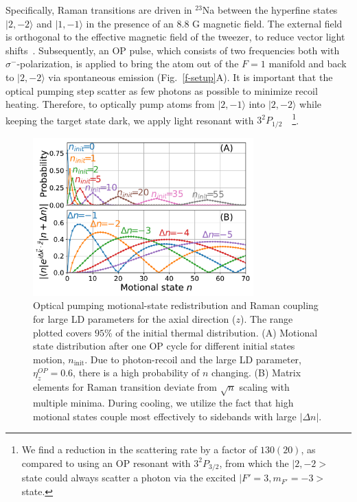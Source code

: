 \documentclass[aps,prl,twocolumn,groupedaddress]{revtex4-1}
\begin{document}
Specifically, Raman transitions are driven in $^{23}$Na between the hyperfine states
$|2, -2\rangle$ and $|1, -1\rangle$ in the presence of an $8.8$ G magnetic field. The external field is
orthogonal to the effective magnetic field of the tweezer, to reduce vector light shifts~\cite{Kaufman2012,Thompson2013}.
Subsequently, an OP pulse, which consists of two frequencies both with $\sigma^-$-polarization, is applied to bring the atom out of the $F=1$ manifold and back to $|2, -2\rangle$ via spontaneous emission (Fig.~\ref{f-setup}A).
It is important that the optical pumping step scatter as few photons as possible to minimize recoil heating.
Therefore, to optically pump atoms from $|2,-1\rangle$ into $|2, -2\rangle$ while keeping the target state dark, we apply light resonant with $3^2P_{1/2}$~\cite{Monroe1995, Grobner2017}~\footnote{We find a reduction in the scattering rate by a factor of $130(20)$, as compared to using an OP resonant with $3^2P_{3/2}$, from which the $|2, -2>$ state could always scatter a photon via the excited $|F'=3, m_{F'}=-3>$ state.}.

\begin{figure}[b]
  \includegraphics[width=8.5cm]{imgs/fig2_raman_op.pdf}
  \caption{Optical pumping motional-state redistribution and Raman coupling for large LD parameters for the axial direction ($z$). The range plotted covers $95$\% of the initial thermal distribution.
    (A) Motional state distribution after one OP cycle for different initial states motion,
    $n_{\textrm{init}}$. Due to photon-recoil and the large LD parameter, $\eta^{OP}_z=0.6$,
    there is a high probability of $n$ changing.
    (B) Matrix elements for Raman transition deviate from
    $\sqrt{n}$ scaling with multiple minima. During cooling, we utilize the fact that high motional states couple most effectively to sidebands with large $|\Delta n|$.
    \label{f-ld}}
\end{figure}
\end{document}
